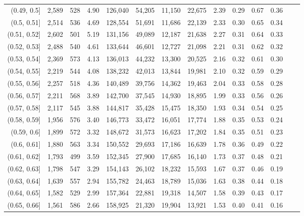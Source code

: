\begin{tabular}{rrrrrrrrrrrrrr}
(0.49, 0.5]    &  2,589 &  528 &    4.90 &  126,040 &   54,205 &  11,150 &  22,675 &  2.39 &  0.29 &  0.67 &      0.36 \\
(0.5, 0.51]    &  2,514 &  536 &    4.69 &  128,554 &   51,691 &  11,686 &  22,139 &  2.33 &  0.30 &  0.65 &      0.34 \\
(0.51, 0.52]   &  2,602 &  501 &    5.19 &  131,156 &   49,089 &  12,187 &  21,638 &  2.27 &  0.31 &  0.64 &      0.33 \\
(0.52, 0.53]   &  2,488 &  540 &    4.61 &  133,644 &   46,601 &  12,727 &  21,098 &  2.21 &  0.31 &  0.62 &      0.32 \\
(0.53, 0.54]   &  2,369 &  573 &    4.13 &  136,013 &   44,232 &  13,300 &  20,525 &  2.16 &  0.32 &  0.61 &      0.30 \\
(0.54, 0.55]   &  2,219 &  544 &    4.08 &  138,232 &   42,013 &  13,844 &  19,981 &  2.10 &  0.32 &  0.59 &      0.29 \\
(0.55, 0.56]   &  2,257 &  518 &    4.36 &  140,489 &   39,756 &  14,362 &  19,463 &  2.04 &  0.33 &  0.58 &      0.28 \\
(0.56, 0.57]   &  2,211 &  568 &    3.89 &  142,700 &   37,545 &  14,930 &  18,895 &  1.99 &  0.33 &  0.56 &      0.26 \\
(0.57, 0.58]   &  2,117 &  545 &    3.88 &  144,817 &   35,428 &  15,475 &  18,350 &  1.93 &  0.34 &  0.54 &      0.25 \\
(0.58, 0.59]   &  1,956 &  576 &    3.40 &  146,773 &   33,472 &  16,051 &  17,774 &  1.88 &  0.35 &  0.53 &      0.24 \\
(0.59, 0.6]    &  1,899 &  572 &    3.32 &  148,672 &   31,573 &  16,623 &  17,202 &  1.84 &  0.35 &  0.51 &      0.23 \\
(0.6, 0.61]    &  1,880 &  563 &    3.34 &  150,552 &   29,693 &  17,186 &  16,639 &  1.78 &  0.36 &  0.49 &      0.22 \\
(0.61, 0.62]   &  1,793 &  499 &    3.59 &  152,345 &   27,900 &  17,685 &  16,140 &  1.73 &  0.37 &  0.48 &      0.21 \\
(0.62, 0.63]   &  1,798 &  547 &    3.29 &  154,143 &   26,102 &  18,232 &  15,593 &  1.67 &  0.37 &  0.46 &      0.19 \\
(0.63, 0.64]   &  1,639 &  557 &    2.94 &  155,782 &   24,463 &  18,789 &  15,036 &  1.63 &  0.38 &  0.44 &      0.18 \\
(0.64, 0.65]   &  1,582 &  529 &    2.99 &  157,364 &   22,881 &  19,318 &  14,507 &  1.58 &  0.39 &  0.43 &      0.17 \\
(0.65, 0.66]   &  1,561 &  586 &    2.66 &  158,925 &   21,320 &  19,904 &  13,921 &  1.53 &  0.40 &  0.41 &      0.16 \\

\end{tabular}
